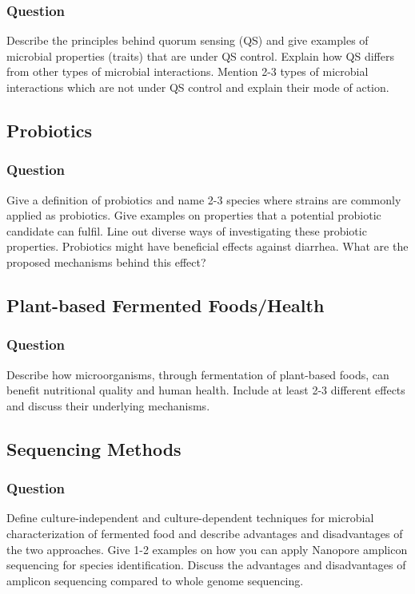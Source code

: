 \subsubsection*{Question}
Describe the principles behind quorum sensing (QS) and give examples of microbial properties (traits) that are under QS control. Explain how QS differs from other types of microbial interactions. Mention 2-3 types of microbial interactions which are not under QS control and explain their mode of action.  

\subsection{Probiotics}
\subsubsection*{Question}
Give a definition of probiotics and name 2-3 species where strains are commonly applied as probiotics. Give examples on properties that a potential probiotic candidate can fulfil. Line out diverse ways of investigating these probiotic properties. Probiotics might have beneficial effects against diarrhea. What are the proposed mechanisms behind this effect?

\subsection{Plant-based Fermented Foods/Health}
\subsubsection*{Question}
Describe how microorganisms, through fermentation of plant-based foods, can benefit nutritional quality and human health. Include at least 2-3 different effects and discuss their underlying mechanisms. 

\subsection{Sequencing Methods}
\subsubsection*{Question}
Define culture-independent and culture-dependent techniques for microbial characterization of fermented food and describe advantages and disadvantages of the two approaches. Give 1-2 examples on how you can apply Nanopore amplicon sequencing for species identification. Discuss the advantages and disadvantages of amplicon sequencing compared to whole genome sequencing. 


